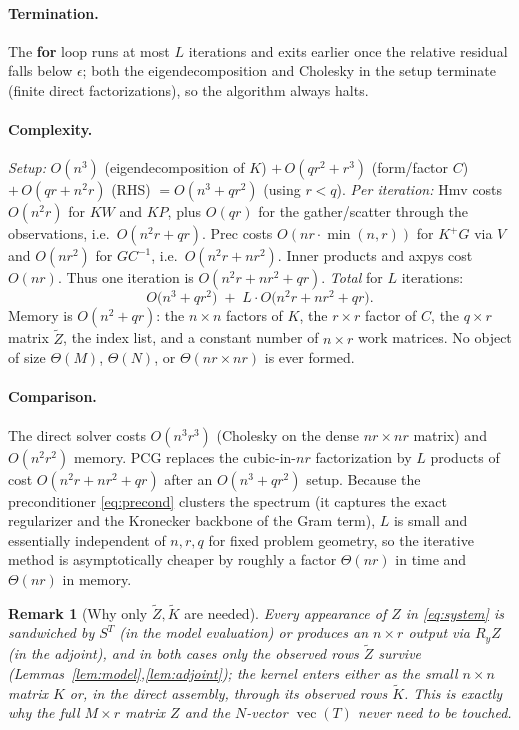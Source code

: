 \documentclass[12pt]{article}
\DeclareMathOperator{\vecop}{vec}
\newcommand{\tZ}{\tilde Z}
\newcommand{\tK}{\tilde K}
\newtheorem{remark}{Remark}
\begin{document}
\paragraph{Termination.}
The {\bf for} loop runs at most $L$ iterations and exits earlier once the relative
residual falls below $\epsilon$; both the eigendecomposition and Cholesky in the setup
terminate (finite direct factorizations), so the algorithm always halts.

\paragraph{Complexity.}
\emph{Setup:} $O(n^3)$ (eigendecomposition of $K$) $+\,O(qr^2+r^3)$ (form/factor $C$)
$+\,O(qr+n^2r)$ (RHS) $=O(n^3+qr^2)$ (using $r<q$).
\emph{Per iteration:} $\mathrm{Hmv}$ costs $O(n^2r)$ for $KW$ and $KP$, plus $O(qr)$
for the gather/scatter through the observations, i.e.\ $O(n^2r+qr)$. $\mathrm{Prec}$
costs $O(nr\cdot\min(n,r))$ for $K^{+}G$ via $V$ and $O(nr^2)$ for $GC^{-1}$, i.e.\
$O(n^2r+nr^2)$. Inner products and {\sc axpy}s cost $O(nr)$. Thus one iteration is
$O(n^2r+nr^2+qr)$.
\emph{Total} for $L$ iterations:
\[
  O\!\big(n^3+qr^2\big)\;+\;L\cdot O\!\big(n^2r+nr^2+qr\big).
\]
Memory is $O(n^2+qr)$: the $n\times n$ factors of $K$, the $r\times r$ factor of $C$,
the $q\times r$ matrix $\tZ$, the index list, and a constant number of $n\times r$
work matrices. No object of size $\Theta(M)$, $\Theta(N)$, or $\Theta(nr\times nr)$ is
ever formed.

\paragraph{Comparison.}
The direct solver costs $O(n^3r^3)$ (Cholesky on the dense $nr\times nr$ matrix) and
$O(n^2r^2)$ memory. PCG replaces the cubic-in-$nr$ factorization by $L$ products of
cost $O(n^2r+nr^2+qr)$ after an $O(n^3+qr^2)$ setup. Because the preconditioner
\eqref{eq:precond} clusters the spectrum (it captures the exact regularizer and the
Kronecker backbone of the Gram term), $L$ is small and essentially independent of
$n,r,q$ for fixed problem geometry, so the iterative method is asymptotically cheaper
by roughly a factor $\Theta(nr)$ in time and $\Theta(nr)$ in memory.

\begin{remark}[Why only $\tZ,\tK$ are needed]
Every appearance of $Z$ in \eqref{eq:system} is sandwiched by $S^{T}$ (in the model
evaluation) or produces an $n\times r$ output via $R_yZ$ (in the adjoint), and in both
cases only the observed rows $\tZ$ survive (Lemmas~\ref{lem:model},\ref{lem:adjoint});
the kernel enters either as the small $n\times n$ matrix $K$ or, in the direct
assembly, through its observed rows $\tK$. This is exactly why the full $M\times r$
matrix $Z$ and the $N$-vector $\vecop(T)$ never need to be touched.
\end{remark}
\end{document}
